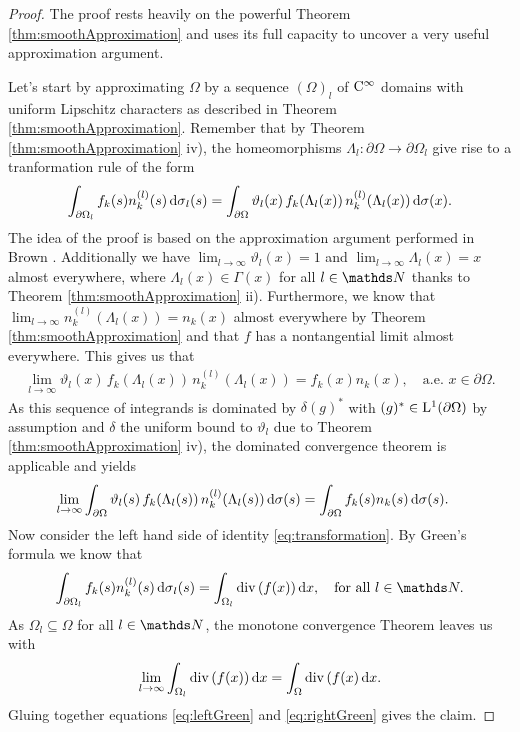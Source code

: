 \begin{proof}
  The proof rests heavily on the powerful Theorem \ref{thm:smoothApproximation} and uses its full capacity to uncover a very useful approximation argument.

  Let's start by approximating $\Omega$ by a sequence $(\Omega)_l$ of $\mathrm{C}^\infty$ domains with uniform Lipschitz characters as described in Theorem \ref{thm:smoothApproximation}. 
  Remember that by Theorem \ref{thm:smoothApproximation} iv), the homeomorphisms $\Lambda_l \colon \partial\Omega \to \partial\Omega_l$ give rise to a tranformation rule of the form 
  \begin{align}
    \label{eq:transformation}
    \int_{\partial\Omega_l} f_k(s) n_k^{(l)}(s) \, {\operatorname{d}\!{\sigma}}_l(s)
    = \int_{\partial\Omega} \vartheta_l(x) \, f_k(\Lambda_l(x)) \, n_k^{(l)}(\Lambda_l(x)) \, {\operatorname{d}\!{\sigma}}(x).
  \end{align}
  The idea of the proof is based on the approximation argument performed in Brown \cite[Prop.\@~2.4]{brown}. 
  Additionally we have $\lim_{l \to \infty} \vartheta_l(x) = 1$ and $\lim_{l \to \infty} \Lambda_l(x) = x$ almost everywhere, where $\Lambda_l(x) \in \Gamma(x)$ for all $l \in \N$ thanks to Theorem \ref{thm:smoothApproximation} ii).
  Furthermore, we know that $\lim_{l \to \infty} n_k^{(l)}(\Lambda_l(x)) = n_k(x)$ almost everywhere by Theorem \ref{thm:smoothApproximation} and that $f$ has a nontangential limit almost everywhere.
  This gives us that 
  \begin{align*}
    \lim_{l \to \infty} \vartheta_l(x) \, f_k(\Lambda_l(x)) \, n_k^{(l)}(\Lambda_l(x)) = f_k(x) n_k(x), \quad\text{a.e. } x \in \partial\Omega.
  \end{align*}
  As this sequence of integrands is dominated by $\delta (g)^*$ with $(g)^* \in \mathrm{L}^1(\partial\Omega)$ by assumption and $\delta$ the uniform bound to $\vartheta_l$ due to Theorem \ref{thm:smoothApproximation} iv), the dominated convergence theorem is applicable and yields
  \begin{align}
    \label{eq:leftGreen}
    \lim_{l \to \infty} \int_{\partial \Omega} \vartheta_l(s) \, f_k(\Lambda_l(s))\,  n_k^{(l)}(\Lambda_l(s))\, {\operatorname{d}\!{\sigma}}(s)
    &= 
    \int_{\partial\Omega} f_k(s) n_k(s) \, {\operatorname{d}\!{\sigma}}(s).
  \end{align}
  Now consider the left hand side of identity \eqref{eq:transformation}.
  By Green's formula \cite[p.\@~711f.]{evans} we know that
  \begin{align*}
    \int_{\partial\Omega_l} f_k(s) n_k^{(l)}(s) \d\sigma_l(s)
    = \int_{\Omega_l} \div(f(x)) \d x, \quad\text{for all } l \in \N.
  \end{align*}
  As $\Omega_l \subseteq \Omega$ for all $l \in \N$, the monotone convergence Theorem leaves us with
  \begin{align}
    \label{eq:rightGreen}
    \lim_{l \to \infty} \int_{\Omega_l} \mathrm{div\,} (f(x)) \, {\operatorname{d}\!{x}} = \int_\Omega \mathrm{div\,} (f(x) \, {\operatorname{d}\!{x}}.
  \end{align}
  Gluing together equations \eqref{eq:leftGreen} and \eqref{eq:rightGreen} gives the claim.
\end{proof}

